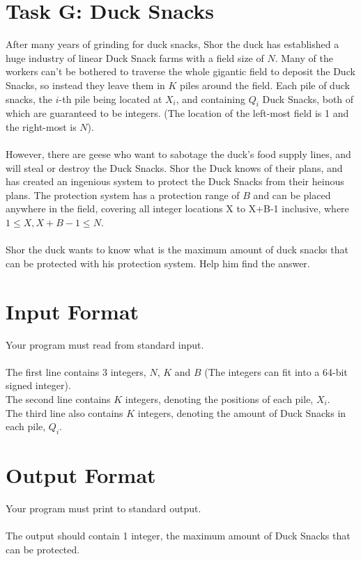 \documentclass{report}
\begin{document}
\section*{Task G: Duck Snacks}
After many years of grinding for duck snacks, Shor the duck has established a huge industry of linear Duck Snack farms with a field size of $N$. Many of the workers can't be bothered to traverse the whole gigantic field to deposit the Duck Snacks, so instead they leave them in $K$ piles around the field. Each pile of duck snacks, the $i$-th pile being located at $X_i$, and containing $Q_i$ Duck Snacks, both of which are guaranteed to be integers. (The location of the left-most field is 1 and the right-most is $N$). 
\\\\
However, there are geese who want to sabotage the duck's food supply lines, and will steal or destroy the Duck Snacks. Shor the Duck knows of their plans, and has created an ingenious system to protect the Duck Snacks from their heinous plans. The protection system has a protection range of $B$ and can be placed anywhere in the field, covering all integer locations X to X+B-1 inclusive, where \(1 \leq X, X+B-1 \leq N\).
\\
\\
Shor the duck wants to know what is the maximum amount of duck snacks that can be protected with his protection system. Help him find the answer.

\section*{Input Format}
Your program must read from standard input.
\\\\
The first line contains 3 integers, $N$, $K$ and $B$ (The integers can fit into a 64-bit signed integer).
\\
The second line contains $K$ integers, denoting the positions of each pile, $X_i$.
\\
The third line also contains $K$ integers, denoting the amount of Duck Snacks in each pile, $Q_i$.

\section*{Output Format}
Your program must print to standard output.
\\\\
The output should contain 1 integer, the maximum amount of Duck Snacks that can be protected.
\end{document}
